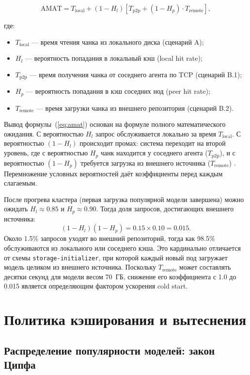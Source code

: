 \begin{equation}
\mathrm{AMAT} = T_{\mathrm{local}} + (1-H_l)\left[T_{\mathrm{p2p}} + (1-H_p) \cdot T_{\mathrm{remote}}\right],
\label{eq:amat}
\end{equation}

где:
\begin{itemize}[leftmargin=*]
  \item $T_{\mathrm{local}}$ --- время чтения чанка из локального диска (сценарий A);
  \item $H_l$ --- вероятность попадания в локальный кэш (local hit rate);
  \item $T_{\mathrm{p2p}}$ --- время получения чанка от соседнего агента по TCP (сценарий B.1);
  \item $H_p$ --- вероятность попадания в кэш соседних нод (peer hit rate);
  \item $T_{\mathrm{remote}}$ --- время загрузки чанка из внешнего репозитория (сценарий B.2).
\end{itemize}

Вывод формулы~(\ref{eq:amat}) основан на формуле полного математического ожидания. С вероятностью $H_l$ запрос обслуживается локально за время $T_{\mathrm{local}}$. С вероятностью $(1-H_l)$ происходит промах: система переходит на второй уровень, где с вероятностью $H_p$ чанк находится у соседнего агента ($T_{\mathrm{p2p}}$), и с вероятностью $(1-H_p)$ требуется загрузка из внешнего источника ($T_{\mathrm{remote}}$) \cite{li2020caching}. Перемножение условных вероятностей даёт коэффициенты перед каждым слагаемым.

После прогрева кластера (первая загрузка популярной модели завершена) можно ожидать $H_l \approx 0.85$ и $H_p \approx 0.90$. Тогда доля запросов, достигающих внешнего источника:
\[
(1-H_l)(1-H_p) = 0.15 \times 0.10 = 0.015.
\]
Около 1.5\% запросов уходят во внешний репозиторий, тогда как 98.5\% обслуживаются из локального или соседнего кэша. Это кардинально отличается от схемы \texttt{storage-initializer}, при которой каждый новый под загружает модель целиком из внешнего источника. Поскольку $T_{\mathrm{remote}}$ может составлять десятки секунд для модели весом 70~ГБ, снижение его коэффициента с 1.0 до 0.015 является определяющим фактором ускорения cold start.

\section{Политика кэширования и вытеснения}

\subsection*{Распределение популярности моделей: закон Ципфа}

